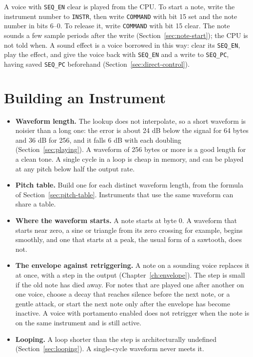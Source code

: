 A voice with \texttt{SEQ\_EN} clear is played from the CPU. To start a note, write the instrument number to
\texttt{INSTR}, then write \texttt{COMMAND} with bit 15 set and the note number in bits 6--0. To release it, write
\texttt{COMMAND} with bit 15 clear. The note sounds a few sample periods after the write
(Section~\ref{sec:note-start}); the CPU is not told when. A sound effect is a voice borrowed in this way: clear its
\texttt{SEQ\_EN}, play the effect, and give the voice back with \texttt{SEQ\_EN} and a write to \texttt{SEQ\_PC},
having saved \texttt{SEQ\_PC} beforehand (Section~\ref{sec:direct-control}).

\section{Building an Instrument}

\begin{itemize}
	\item \textbf{Waveform length.} The lookup does not interpolate, so a short waveform is noisier than a long one: the
	      error is about 24 dB below the signal for 64 bytes and 36 dB for 256, and it falls 6 dB with each doubling
	      (Section~\ref{sec:playing}). A waveform of 256 bytes or more is a good length for a clean tone. A single cycle in a loop
	      is cheap in memory, and can be played at any pitch below half the output rate.
	\item \textbf{Pitch table.} Build one for each distinct waveform length, from the formula of
	      Section~\ref{sec:pitch-table}. Instruments that use the same waveform can share a table.
	\item \textbf{Where the waveform starts.} A note starts at byte 0. A waveform that starts near zero, a sine or triangle
	      from its zero crossing for example, begins smoothly, and one that starts at a peak, the usual form of a sawtooth, does
	      not.
	\item \textbf{The envelope against retriggering.} A note on a sounding voice replaces it at once, with a step in the
	      output (Chapter~\ref{ch:envelope}). The step is small if the old note has died away. For notes that are played
	      one after another on one voice, choose a decay that reaches silence before the next note, or a gentle attack, or start the next note only after the envelope has become inactive. A voice with portamento enabled does not retrigger when the note is on
	      the same instrument and is still active.
	\item \textbf{Looping.} A loop shorter than the step is architecturally undefined (Section~\ref{sec:looping}). A
	      single-cycle waveform never meets it.
\end{itemize}

